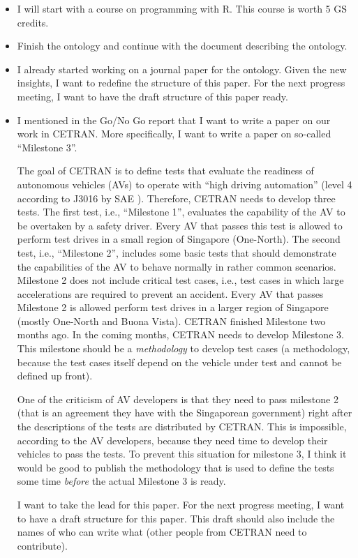 \documentclass[10pt,final,a4paper,oneside,onecolumn]{article}
\begin{document}
\begin{itemize}
	\item I will start with a course on programming with R. This course is worth 5 GS credits.
	
	\item Finish the ontology and continue with the document describing the ontology.
	
	\item I already started working on a journal paper for the ontology. Given the new insights, I want to redefine the structure of this paper. For the next progress meeting, I want to have the draft structure of this paper ready.
	
	\item I mentioned in the Go/No Go report that I want to write a paper on our work in CETRAN. More specifically, I want to write a paper on so-called ``Milestone 3''.
	
	The goal of CETRAN is to define tests that evaluate the readiness of autonomous vehicles (AVs) to operate with ``high driving automation'' (level 4 according to J3016 by SAE \cite{sea2018j3016}). Therefore, CETRAN needs to develop three tests. The first test, i.e., ``Milestone 1'', evaluates the capability of the AV to be overtaken by a safety driver. Every AV that passes this test is allowed to perform test drives in a small region of Singapore (One-North). The second test, i.e., ``Milestone 2'', includes some basic tests that should demonstrate the capabilities of the AV to behave normally in rather common scenarios. Milestone 2 does not include critical test cases, i.e., test cases in which large accelerations are required to prevent an accident. Every AV that passes Milestone 2 is allowed perform test drives in a larger region of Singapore (mostly One-North and Buona Vista). CETRAN finished Milestone two months ago. In the coming months, CETRAN needs to develop Milestone 3. This milestone should be a \emph{methodology} to develop test cases (a methodology, because the test cases itself  depend on the vehicle under test and cannot be defined up front).
	
	One of the criticism of AV developers is that they need to pass milestone 2 (that is an agreement they have with the Singaporean government) right after the descriptions of the tests are distributed by CETRAN. This is impossible, according to the AV developers, because they need time to develop their vehicles to pass the tests. To prevent this situation for milestone 3, I think it would be good to publish the methodology that is used to define the tests some time \emph{before} the actual Milestone 3 is ready. 
	
	I want to take the lead for this paper. For the next progress meeting, I want to have a draft structure for this paper. This draft should also include the names of who can write what (other people from CETRAN need to contribute).
\end{itemize}


\printbibliography

\newpage

\end{document}
